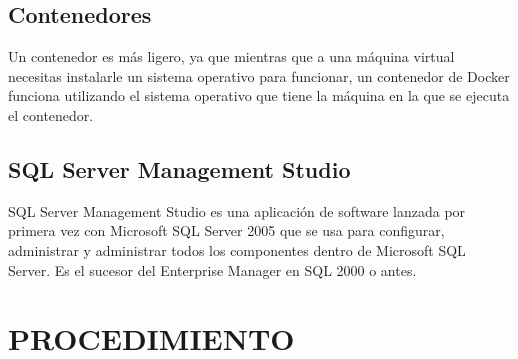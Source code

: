 \documentclass[preprint,12pt]{elsarticle}
\begin{document}
\subsection {\textbf{Contenedores}}
Un contenedor es más ligero, ya que mientras que a una máquina virtual necesitas instalarle un sistema operativo para funcionar, un contenedor de Docker funciona utilizando el sistema operativo que tiene la máquina en la que se ejecuta el contenedor.
\subsection{\textbf{SQL Server Management Studio}}
SQL Server Management Studio es una aplicación de software lanzada por primera vez con Microsoft SQL Server 2005 que se usa para configurar, administrar y administrar todos los componentes dentro de Microsoft SQL Server. Es el sucesor del Enterprise Manager en SQL 2000 o antes.


\section{PROCEDIMIENTO}
\end{document}
